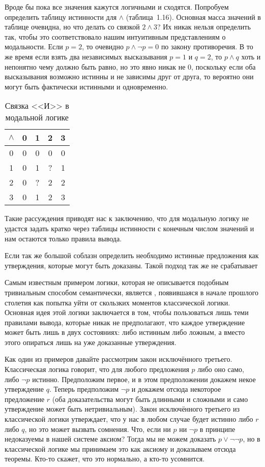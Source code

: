Вроде бы пока все значения кажутся логичными и сходятся. Попробуем определить таблицу истинности для $\land$ (таблица~1.16). Основная масса значений в таблице очевидна, но что делать со связкой $2\land 3$?  Их никак нельзя определить так, чтобы это соответствовало нашим интуитивным представлениям о модальности. Если $p=2$, то очевидно $p\land\neg p = 0$ по закону противоречия. В то же время если взять два независимых высказывания $p=1$ и $q=2$, то $p\land q$ хоть и непонятно чему должно быть равно, но это явно никак не 0, поскольку если оба высказывания возможно истинны и не зависимы друг от друга, то вероятно они могут быть фактически истинными и одновременно.

\begin{table}[h]
\centering
\begin{tabular}{c | c c c c}
$\land$ & 0 &1 &2 & 3 \\
\hline
0 & 0 & 0 & 0 & 0\\
1 & 0 & 1 & ? & 1\\
2 & 0 & ? & 2 & 2\\
3 & 0 & 1 & 2 & 3
\end{tabular}
\caption{Связка <<И>> в модальной логике}\label{table:kleene-or}
\end{table}

Такие рассуждения приводят нас к заключению, что для модальную логику не удастся задать кратко через таблицы истинности с конечным числом значений и нам остаются только правила вывода.

Если так же большой соблазн определить необходимо истинные предложения как утверждения, которые могут быть доказаны. Такой подход так же не срабатывает 


Самым известным примером логики, которая не описывается подобным тривиальным способом семантически, является , появившаяся в начале прошлого столетия как попытка уйти от скользких моментов классической логики. Основная идея этой логики заключается в том, чтобы пользоваться лишь теми правилами вывода, которые никак не предполагают, что каждое утверждение может быть лишь в двух состояниях: либо истинным либо ложным, а вместо этого опираться лишь на уже доказанные утверждения.

Как один из примеров давайте рассмотрим закон исключённого третьего. Классическая логика говорит, что для любого предложения $p$ либо оно само, либо $\neg p$ истинно. Предположим первое, и в этом предположении докажем некое утверждение $q$. Теперь предположим $\neg p$ и докажем отсюда некоторое предложение $r$ (оба доказательства могут быть длинными и сложными и само утверждение может быть нетривиальным). Закон исключённого третьего из классической логики утверждает, что у нас в любом случае будет истинно либо $r$ либо $q$, но это может вызвать сомнения. Что, если ни $p$ ни $\neg p$ в принципе недоказуемы в нашей системе аксиом? Тогда мы не можем доказать $p \lor \neg \neg p$, но в классической логике мы принимаем это как аксиому и доказываем отсюда теоремы. Кто-то скажет, что это нормально, а кто-то усомнится.


